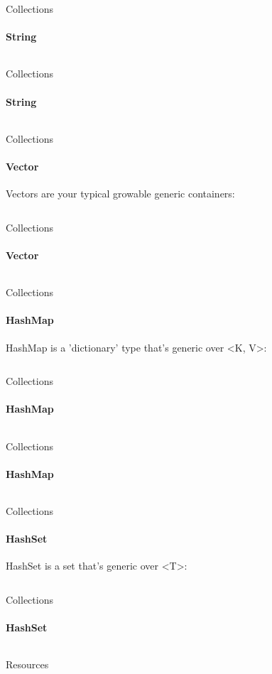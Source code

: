 \documentclass[usenames,dvipsnames,10pt,aspectratio=169]{beamer}
\begin{document}
\begin{frame}{Collections}
	\framesubtitle{String}
	\large
	\inputminted[fontsize=\large]{rust}{code/string2.rs}
	\vspace{0.3cm}
\end{frame}

\begin{frame}{Collections}
	\framesubtitle{String}
	\large
	\inputminted[fontsize=\large]{rust}{code/string3.rs}
	\vspace{0.3cm}
\end{frame}

\begin{frame}{Collections}
	\framesubtitle{Vector}
	\large
	Vectors are your typical growable generic containers:
	\vspace{0.3cm}
	\inputminted[fontsize=\large]{rust}{code/vector.rs}
\end{frame}

\begin{frame}{Collections}
	\framesubtitle{Vector}
	\large
	\inputminted[fontsize=\normalsize]{rust}{code/vector1.rs}
	\vspace{0.3cm}
\end{frame}

\begin{frame}{Collections}
	\framesubtitle{HashMap}
	\large
	HashMap is a 'dictionary' type that's generic over <K, V>:
	\vspace{0.2cm}
	\inputminted[fontsize=\normalsize]{rust}{code/hashmap.rs}
\end{frame}

\begin{frame}{Collections}
	\framesubtitle{HashMap}
	\large
	\inputminted[fontsize=\large]{rust}{code/hashmap1.rs}
	\vspace{0.3cm}
\end{frame}

\begin{frame}{Collections}
	\framesubtitle{HashMap}
	\large
	\inputminted[fontsize=\Large]{rust}{code/hashmap2.rs}
	\vspace{0.3cm}
\end{frame}

\begin{frame}{Collections}
	\framesubtitle{HashSet}
	\large
	HashSet is a set that's generic over <T>:
	\vspace{0.2cm}
	\inputminted[fontsize=\normalsize]{rust}{code/hashset.rs}
\end{frame}

\begin{frame}{Collections}
	\framesubtitle{HashSet}
	\large
	\inputminted[fontsize=\large]{rust}{code/hashset1.rs}
\end{frame}

\begin{frame}{Resources}
	\Large
\end{frame}

\end{document}
